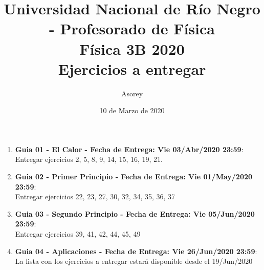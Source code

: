 \documentclass[a4paper,12pt]{article}
\begin{document}
\title{
{\normalsize{Universidad Nacional de Río Negro - Profesorado de Física}}\\
Física 3B 2020\\ Ejercicios a entregar}
\author{Asorey}
\date{10 de Marzo de 2020}
\maketitle

\begin{enumerate}
	\item {\bf{Guia 01 - El Calor - Fecha de Entrega: Vie 03/Abr/2020 23:59}}:\\
		Entregar ejercicios 2, 5, 8, 9, 14, 15, 16, 19, 21.
	\item {\bf{Guia 02 - Primer Principio - Fecha de Entrega: Vie 01/May/2020 23:59}}:\\		
		Entregar ejercicios 22, 23, 27, 30, 32, 34, 35, 36, 37
	\item {\bf{Guia 03 - Segundo Principio - Fecha de Entrega: Vie 05/Jun/2020 23:59}}:\\		
		Entregar ejercicios 39, 41, 42, 44, 45, 49
	\item {\bf{Guia 04 - Aplicaciones - Fecha de Entrega: Vie 26/Jun/2020 23:59}}:\\		
		La lista con los ejercicios a entregar estará disponible desde el 19/Jun/2020
\end{enumerate}
\end{document}
